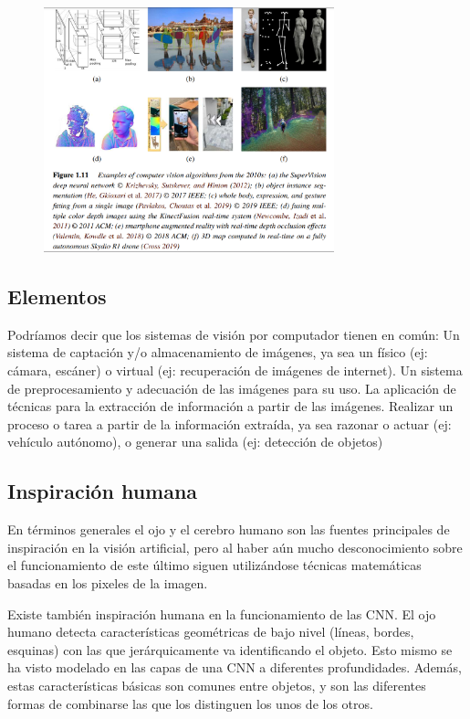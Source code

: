 \begin{figure}[H]
    \centerfloat
    \includegraphics[width=0.75\textwidth]{img/10s.png}
\end{figure}

\subsection{Elementos}

Podríamos decir que los sistemas de visión por computador tienen en común:
Un sistema de captación y/o almacenamiento de imágenes, ya sea un físico (ej: cámara, escáner) o virtual (ej: recuperación de imágenes de internet).
Un sistema de preprocesamiento y adecuación de las imágenes para su uso.
La aplicación de técnicas para la extracción de información a partir de las imágenes. 
Realizar un proceso o tarea a partir de la información extraída, ya sea razonar o actuar (ej: vehículo autónomo), o generar una salida (ej: detección de objetos)

\subsection{Inspiración humana}

En términos generales el ojo y el cerebro humano son las fuentes principales de inspiración en la visión artificial, pero al haber aún mucho desconocimiento sobre el funcionamiento de este último siguen utilizándose técnicas matemáticas basadas en los pixeles de la imagen.

Existe también inspiración humana en la funcionamiento de las CNN. El ojo humano detecta características geométricas de bajo nivel (líneas, bordes, esquinas) con las que jerárquicamente va identificando el objeto. Esto mismo se ha visto modelado en las capas de una CNN a diferentes profundidades. Además, estas características básicas son comunes entre objetos, y son las diferentes formas de combinarse las que los distinguen los unos de los otros.